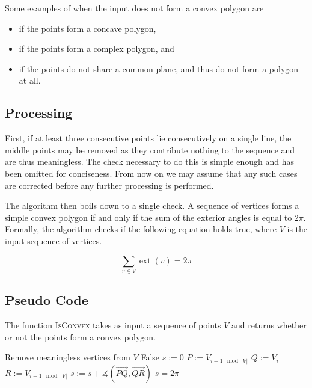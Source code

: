 \documentclass{article}
\newcommand{\vecl}{\overrightarrow} %
\newcommand{\ang}[1]{\measuredangle\left( #1 \right)}
\newcommand{\exta}[1]{\operatorname{ext}\left( #1 \right)} %
\begin{document}
Some examples of when the input does not form a convex polygon are
\begin{itemize}
	\item if the points form a concave polygon,
	\item if the points form a complex polygon, and
	\item if the points do not share a common plane, and thus do not form a polygon at all.
\end{itemize}

\subsection{Processing}

First, if at least three consecutive points lie consecutively on a single line, the middle points may be removed as they contribute nothing to the sequence and are thus meaningless. The check necessary to do this is simple enough and has been omitted for conciseness. From now on we may assume that any such cases are corrected before any further processing is performed.

The algorithm then boils down to a single check. A sequence of vertices forms a simple convex polygon if and only if the sum of the exterior angles is equal to \(2\pi\). Formally, the algorithm checks if the following equation holds true, where \(V\) is the input sequence of vertices.

\begin{equation*}
	\sum_{v \in V} \exta{v} = 2\pi
\end{equation*}

\subsection{Pseudo Code}

The function \textsc{IsConvex} takes as input a sequence of points \(V\) and returns whether or not the points form a convex polygon.

\begin{algorithm}[htbp]
	\begin{algorithmic}
		\State Remove meaningless vertices from \(V\)
		\Return False
		\EndIf
		\State \(s := 0\) 
		\State \(P := V_{i-1 \mod |V|}\) 
		\State \(Q := V_{i}\) 
		\State \(R := V_{i+1 \mod |V|}\) 
		\State \(s := s + \ang{\vecl{PQ}, \vecl{QR}}\) 
		\EndFor
		\State\Return \(s = 2\pi\)
		\EndFunction
	\end{algorithmic}
\end{algorithm}
\end{document}

